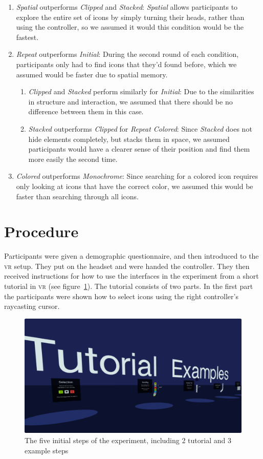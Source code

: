 \documentclass{tufte-book} %
\begin{document}
\begin{enumerate}[label=H\arabic*. , wide=0.5em,  leftmargin=*]
  \item \emph{Spatial} outperforms \emph{Clipped} and \emph{Stacked}: \emph{Spatial} allows participants to explore the entire set of icons by simply turning their heads, rather than using the controller, so we assumed it would this condition would be the fastest.
  \item \emph{Repeat} outperforms \emph{Initial}: During the second round of each condition, participants only had to find icons that they'd found before, which we assumed would be faster due to spatial memory.
  \begin{enumerate}[label=H2.\arabic*. , wide=0.5em,  leftmargin=*]
    \item \emph{Clipped} and \emph{Stacked} perform similarly for \emph{Initial}: Due to the similarities in structure and interaction, we assumed that there should be no difference between them in this case.
    \item \emph{Stacked} outperforms \emph{Clipped} for \emph{Repeat Colored}: Since \emph{Stacked} does not hide elements completely, but stacks them in space, we assumed participants would have a clearer sense of their position and find them more easily the second time.
  \end{enumerate}
  \item \emph{Colored} outperforms \emph{Monochrome}: Since searching for a colored icon requires only looking at icons that have the correct color, we assumed this would be faster than searching through all icons.
\end{enumerate}

\section{Procedure}
Participants were given a demographic questionnaire, and then introduced to the \textsc{vr} setup. They put on the headset and were handed the controller. They then received instructions for how to use the interfaces in the experiment from a short tutorial in \textsc{vr} (see figure~\ref{fig:tutorials}). The tutorial consists of two parts.
In the first part the participants were shown how to select icons using the right controller's raycasting cursor.

\begin{figure}
  \includegraphics{tutorials.png}
  \caption{The five initial steps of the experiment, including 2 tutorial and 3 example steps}
  \label{fig:tutorials}
\end{figure}
\end{document}
